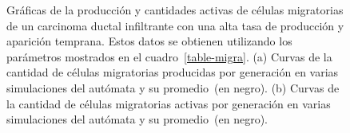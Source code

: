 \begin{figure}[p]
\begin{center}
\vspace*{-0.25cm}
\end{center}\vspace*{-0.6cm}
\caption[Gr\'aficas de la producci\'on y cantidades activas de c\'elulas migratorias de un carcinoma ductal infiltrante con una alta tasa de producci\'on y aparici\'on temprana]{Gr\'aficas de la producci\'on y cantidades activas de c\'elulas migratorias de un carcinoma ductal infiltrante con una alta tasa de producci\'on y aparici\'on temprana. Estos datos se obtienen utilizando los par\'ametros mostrados en el cuadro~\ref{table-migra}. (a) Curvas de la cantidad de c\'elulas migratorias producidas por generaci\'on en varias simulaciones del aut\'omata y su promedio~(en negro). (b) Curvas de la cantidad de c\'elulas migratorias activas por generaci\'on en varias simulaciones del aut\'omata y su promedio~(en negro).}
\label{graph-migra-app}
\end{figure}

